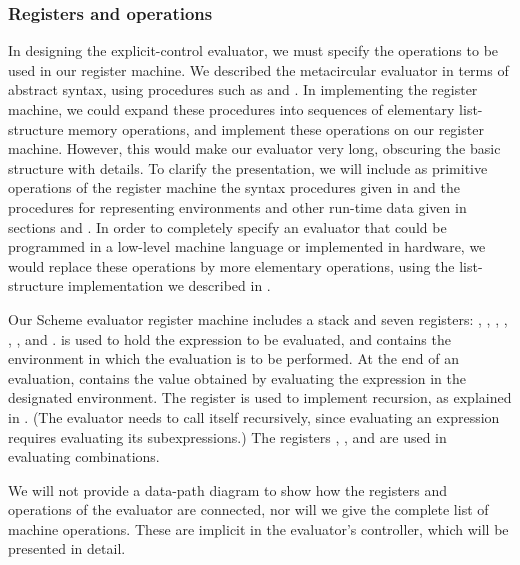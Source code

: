 \subsubsection*{Registers and operations}

In designing the explicit-control evaluator, we must specify the operations to be used in our register machine.
We described the metacircular evaluator in terms of abstract syntax, using procedures such as  and .
In implementing the register machine, we could expand these procedures into sequences of elementary list-structure memory operations, and implement these operations on our register machine.
However, this would make our evaluator very long, obscuring the basic structure with details.
To clarify the presentation, we will include as primitive operations of the register machine the syntax procedures given in  and the procedures for representing environments and other run-time data given in sections  and .
In order to completely specify an evaluator that could be programmed in a low-level machine language or implemented in hardware, we would replace these operations by more elementary operations, using the list-structure implementation we described in .

Our Scheme evaluator register machine includes a stack and seven registers:
, , , , , , and .
 is used to hold the expression to be evaluated, and  contains the environment in which the evaluation is to be performed.
At the end of an evaluation,  contains the value obtained by evaluating the expression in the designated environment.
The  register is used to implement recursion, as explained in .
(The evaluator needs to call itself recursively, since evaluating an expression requires evaluating its subexpressions.)
The registers , , and  are used in evaluating combinations.

We will not provide a data-path diagram to show how the registers and operations of the evaluator are connected, nor will we give the complete list of machine operations.
These are implicit in the evaluator’s controller, which will be presented in detail.





